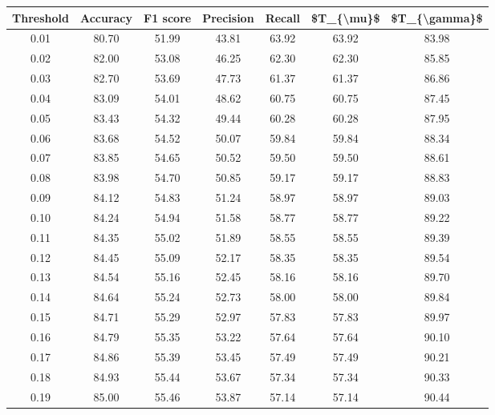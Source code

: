 \begin{tabular}{|c|c|c|c|c|c|c|}
\hline
 Threshold &  Accuracy &  F1 score &  Precision &  Recall &  \$T\_\{\textbackslash mu\}\$ &  \$T\_\{\textbackslash gamma\}\$ \\
\hline
      0.01 &     80.70 &     51.99 &      43.81 &   63.92 &      63.92 &         83.98 \\
      0.02 &     82.00 &     53.08 &      46.25 &   62.30 &      62.30 &         85.85 \\
      0.03 &     82.70 &     53.69 &      47.73 &   61.37 &      61.37 &         86.86 \\
      0.04 &     83.09 &     54.01 &      48.62 &   60.75 &      60.75 &         87.45 \\
      0.05 &     83.43 &     54.32 &      49.44 &   60.28 &      60.28 &         87.95 \\
      0.06 &     83.68 &     54.52 &      50.07 &   59.84 &      59.84 &         88.34 \\
      0.07 &     83.85 &     54.65 &      50.52 &   59.50 &      59.50 &         88.61 \\
      0.08 &     83.98 &     54.70 &      50.85 &   59.17 &      59.17 &         88.83 \\
      0.09 &     84.12 &     54.83 &      51.24 &   58.97 &      58.97 &         89.03 \\
      0.10 &     84.24 &     54.94 &      51.58 &   58.77 &      58.77 &         89.22 \\
      0.11 &     84.35 &     55.02 &      51.89 &   58.55 &      58.55 &         89.39 \\
      0.12 &     84.45 &     55.09 &      52.17 &   58.35 &      58.35 &         89.54 \\
      0.13 &     84.54 &     55.16 &      52.45 &   58.16 &      58.16 &         89.70 \\
      0.14 &     84.64 &     55.24 &      52.73 &   58.00 &      58.00 &         89.84 \\
      0.15 &     84.71 &     55.29 &      52.97 &   57.83 &      57.83 &         89.97 \\
      0.16 &     84.79 &     55.35 &      53.22 &   57.64 &      57.64 &         90.10 \\
      0.17 &     84.86 &     55.39 &      53.45 &   57.49 &      57.49 &         90.21 \\
      0.18 &     84.93 &     55.44 &      53.67 &   57.34 &      57.34 &         90.33 \\
      0.19 &     85.00 &     55.46 &      53.87 &   57.14 &      57.14 &         90.44 \\

\end{tabular}
